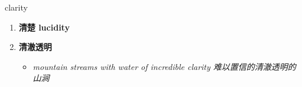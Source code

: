 
\begin{frame}
{\huge clarity}
\begin{center}
\begin{enumerate}\Large
  \item \textbf{清楚 lucidity}
  \item \textbf{清澈透明}
  \begin{itemize}
    \item \em{\Large{mountain streams with water of incredible clarity 难以置信的清澈透明的山涧}}
  \end{itemize}
\end{enumerate}
\end{center}
\end{frame}
